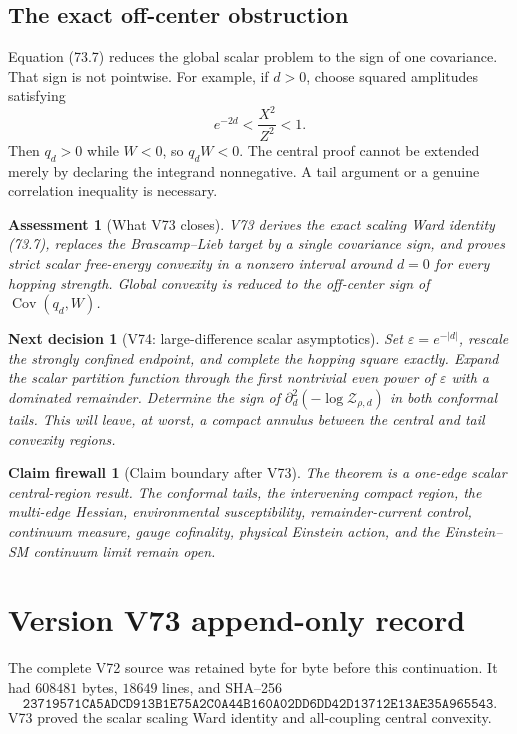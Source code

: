 \documentclass[11pt]{article}
\newtheorem{firewall}[theorem]{Claim firewall}
\newtheorem{decision}[theorem]{Next decision}
\newtheorem{assessment}[theorem]{Assessment}
\theoremstyle{remark}
\begin{document}
\subsection{The exact off-center obstruction}

Equation (73.7) reduces the global scalar problem to the sign of one
covariance.  That sign is not pointwise.  For example, if \(d>0\),
choose squared amplitudes satisfying
\[
 e^{-2d}<\frac{X^2}{Z^2}<1.                       \tag{73.14}
\]
Then \(q_d>0\) while \(W<0\), so \(q_dW<0\).  The central proof cannot
be extended merely by declaring the integrand nonnegative.  A tail
argument or a genuine correlation inequality is necessary.

\begin{assessment}[What V73 closes]
\label{ass:v17v73-status}
V73 derives the exact scaling Ward identity (73.7), replaces the
Brascamp--Lieb target by a single covariance sign, and proves strict
scalar free-energy convexity in a nonzero interval around \(d=0\) for
every hopping strength.  Global convexity is reduced to the off-center
sign of \(\operatorname{Cov}(q_d,W)\).
\end{assessment}

\begin{decision}[V74: large-difference scalar asymptotics]
\label{dec:v17v73-next}
Set \(\varepsilon=e^{-|d|}\), rescale the strongly confined endpoint,
and complete the hopping square exactly.  Expand the scalar partition
function through the first nontrivial even power of \(\varepsilon\)
with a dominated remainder.  Determine the sign of
\(\partial_d^2(-\log\mathcal Z_{\rho,d})\) in both conformal tails.
This will leave, at worst, a compact annulus between the central and
tail convexity regions.
\end{decision}

\begin{firewall}[Claim boundary after V73]
\label{fire:v17v73}
The theorem is a one-edge scalar central-region result.  The conformal
tails, the intervening compact region, the multi-edge Hessian,
environmental susceptibility, remainder-current control, continuum
measure, gauge cofinality, physical Einstein action, and the
Einstein--SM continuum limit remain open.
\end{firewall}

\section*{Version V73 append-only record}
The complete V72 source was retained byte for byte before this
continuation.  It had \(608481\) bytes, \(18649\) lines, and SHA--256
\[
 \texttt{23719571CA5ADCD913B1E75A2C0A44B160A02DD6DD42D13712E13AE35A965543}.
\]
V73 proved the scalar scaling Ward identity and all-coupling central
convexity.
\end{document}
